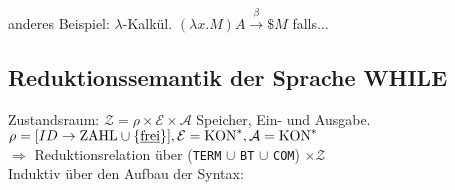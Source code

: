 anderes Beispiel: $\lambda$-Kalkül. $(\lambda x.M) A \xrightarrow{\beta}  \$ M$ falls...

\subsection{Reduktionssemantik der Sprache WHILE}
Zustandsraum: $\mathcal{Z} = \rho \times \mathcal{E} \times \mathcal{A}$ Speicher, Ein- und Ausgabe.
$\rho = [ID \rightarrow \text{\lstinline!ZAHL!} \cup \{\text{\underline{frei}}\}], \mathcal{E}=\text{\lstinline!KON!}^*, \mathcal{A}=\text{\lstinline!KON!}^*$\\
$\Rightarrow$ Reduktionsrelation über (\lstinline!TERM! $\cup$ \lstinline!BT! $\cup$ \lstinline!COM!) $\times \mathcal{Z}$\\
Induktiv über den Aufbau der Syntax:
